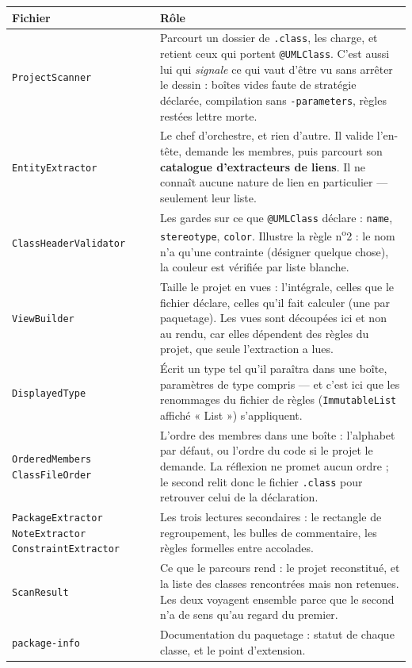 \documentclass[12pt, a4paper]{article}
\begin{document}
\begin{longtable}{L{4.2cm} L{10cm}}
\toprule
\textbf{Fichier} & \textbf{Rôle} \\
\midrule
\endhead
\texttt{ProjectScanner} &
Parcourt un dossier de \texttt{.class}, les charge, et retient ceux qui portent
\texttt{@UMLClass}. C'est aussi lui qui \emph{signale} ce qui vaut d'être vu sans arrêter le
dessin : boîtes vides faute de stratégie déclarée, compilation sans \texttt{-parameters}, règles
restées lettre morte. \\
\addlinespace
\texttt{EntityExtractor} &
Le chef d'orchestre, et rien d'autre. Il valide l'en-tête, demande les membres, puis parcourt son
\textbf{catalogue d'extracteurs de liens}. Il ne connaît aucune nature de lien en particulier —
seulement leur liste. \\
\addlinespace
\texttt{ClassHeaderValidator} &
Les gardes sur ce que \texttt{@UMLClass} déclare : \texttt{name}, \texttt{stereotype},
\texttt{color}. Illustre la règle n\textsuperscript{o}2 : le nom n'a qu'une contrainte
(désigner quelque chose), la couleur est vérifiée par liste blanche. \\
\addlinespace
\texttt{ViewBuilder} &
Taille le projet en vues : l'intégrale, celles que le fichier déclare, celles qu'il fait calculer
(une par paquetage). Les vues sont découpées ici et non au rendu, car elles dépendent des règles
du projet, que seule l'extraction a lues. \\
\addlinespace
\texttt{DisplayedType} &
Écrit un type tel qu'il paraîtra dans une boîte, paramètres de type compris — et c'est ici que
les renommages du fichier de règles (\texttt{ImmutableList} affiché « List ») s'appliquent. \\
\addlinespace
\texttt{OrderedMembers} \newline \texttt{ClassFileOrder} &
L'ordre des membres dans une boîte : l'alphabet par défaut, ou l'ordre du code si le projet le
demande. La réflexion ne promet aucun ordre ; le second relit donc le fichier \texttt{.class}
pour retrouver celui de la déclaration. \\
\addlinespace
\texttt{PackageExtractor} \newline \texttt{NoteExtractor} \newline \texttt{ConstraintExtractor} &
Les trois lectures secondaires : le rectangle de regroupement, les bulles de commentaire, les
règles formelles entre accolades. \\
\addlinespace
\texttt{ScanResult} &
Ce que le parcours rend : le projet reconstitué, et la liste des classes rencontrées mais non
retenues. Les deux voyagent ensemble parce que le second n'a de sens qu'au regard du premier. \\
\addlinespace
\texttt{package-info} &
Documentation du paquetage : statut de chaque classe, et le point d'extension. \\
\bottomrule
\end{longtable}
\end{document}
